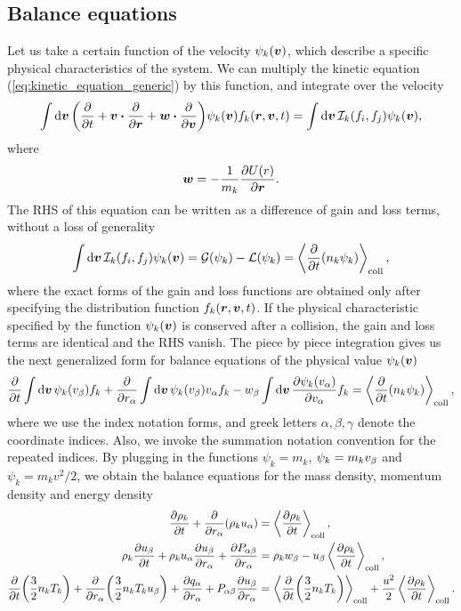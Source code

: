 \documentclass[aps,prl,preprint,groupedaddress,10pt]{revtex4-2}
\begin{document}
\subsection{Balance equations}
Let us take a certain function of the velocity $\psi_k(\vb*{v})$, which describe a specific physical
characteristics of the system. We can multiply the kinetic equation (\ref{eq:kinetic_equation_generic})
by this function, and integrate over the velocity
\begin{equation}
    \int\dd{\bv}\pqty{\pdv{t}+\bv\vdot\pdv{\br}+\bw\vdot\pdv{\bv}}
    \psi_k(\bv)f_k\pqty{\br,\bv,t}=\int\dd{\bv}\mathcal{I}_k\pqty{f_i,f_j}\psi_k(\bv),
\end{equation}
where
\begin{equation}
    \vb*{w} = -\frac{1}{m_k}\pdv{U(r)}{\vb*{r}}.
\end{equation}
The RHS of this equation can be written as a difference of gain and loss terms, without a loss
of generality
\begin{equation}
    \int\dd{\bv}\mathcal{I}_k\pqty{f_i,f_j}\psi_k(\bv)=\mathcal{G}(\psi_k)-\mathcal{L}(\psi_k)=
    \ltx{\avg{\pdv{t}\pqty{n_k\psi_k}}}{coll},
\end{equation}
where the exact forms of the gain and loss functions are obtained only after specifying the
distribution function $f_k\pqty{\br,\bv,t}$. If the physical characteristic specified by the function
$\psi_k(\vb*{v})$ is conserved after a collision, the gain and loss terms are identical and the RHS
vanish. The piece by piece integration gives us the next generalized form for balance equations
of the physical value $\psi_k(\vb*{v})$
\begin{equation}
    \pdv{t}\int\dd{\bv}\psi_k\pqty{\ib{v}}f_k+
    \pdv{\ia{r}}\int\dd{\bv}\psi_k\pqty{\ib{v}}\ia{v}f_k-
    \ib{w}\int\dd{\bv}\pdv{\psi_k\pqty{\ia{v}}}{\ia{v}}f_k=
    \ltx{\avg{\pdv{t}\pqty{n_k\psi_k}}}{coll},
\end{equation}
where we use the index notation forms, and greek letters $\alpha,\beta,\gamma$ denote the
coordinate indices. Also, we invoke the summation notation convention for the repeated indices.
By plugging in the functions $\psi_k=m_k$, $\psi_k=m_k{v}_{\beta}$ and $\psi_k=m_kv^2/2$, we obtain
the balance equations for the mass density, momentum density and energy density
\begin{equation}
    \begin{split}
        \pdv{\rho_k}{t}+\pdv{\ia{r}}\pqty{\rho_k\ia{u}} &=\ltx{\avg{\pdv{\rho_k}{t}}}{coll},\\
        \rho_k\pdv{\ib{u}}{t}+\rho_k\ia{u}\pdv{\ib{u}}{\ia{r}}+\pdv{\iab{P}}{\ia{r}}&=
        \rho_k\ib{w}-\ib{u}\ltx{\avg{\pdv{\rho_k}{t}}}{coll},\\
        \pdv{t}\pqty{\frac{3}{2}n_kT_k}+\pdv{\ia{r}}\pqty{\frac{3}{2}n_kT_k\ib{u}}+
        \pdv{\ia{q}}{\ia{r}}+\iab{P}\pdv{\ib{u}}{\ia{r}}&=
        \ltx{\avg{\pdv{t}\pqty{\frac{3}{2}n_kT_k}}}{coll}+
        \frac{u^2}{2}\ltx{\avg{\pdv{\rho_k}{t}}}{coll}.
    \end{split}
\end{equation}
\end{document}
